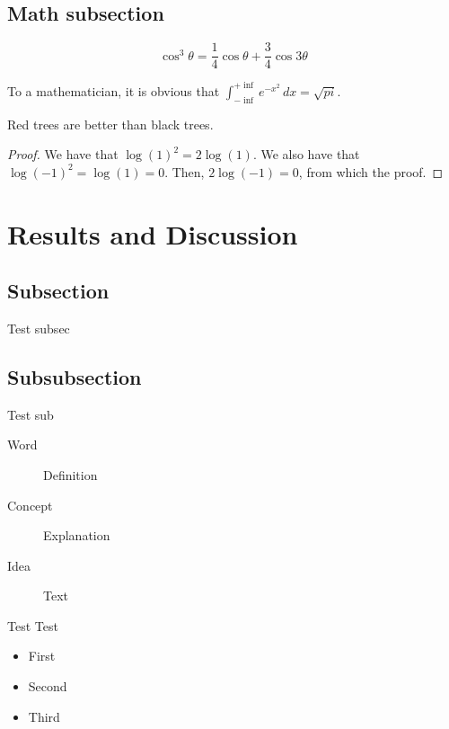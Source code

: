 \documentclass[10pt, 
a4paper, 
oneside, 
headinclude, footinclude, 
BCOR5mm]
{scrartcl}
\begin{document}
\subsection{Math subsection}

\begin{equation}
    \cos^3 \theta = \frac{1}{4}\cos\theta + \frac{3}{4}\cos 3\theta
    \label{eq:refname2}
\end{equation}

\begin{definition}[Gauss]
    To a mathematician, it is obvious that
    $\int_{-\inf}^{+\inf} e^{-x^2}\, dx=\sqrt{pi}$.
\end{definition}

\begin{theorem}
    Red trees are better than black trees.
\end{theorem}

\begin{proof}
    We have that $\log(1)^2 = 2\log(1)$.
    We also have that $\log(-1)^2 = \log(1) = 0$.
    Then, $2\log(-1) = 0$, from which the proof.
\end{proof}

\section{Results and Discussion}

\subsection{Subsection}
Test subsec

\subsection{Subsubsection}
Test sub

\begin{description}
    \item[Word] Definition
    \item[Concept] Explanation
    \item[Idea] Text
\end{description}

Test Test

\begin{itemize}[noitemsep]
    \item First
    \item Second
    \item Third
\end{itemize}
\end{document}
